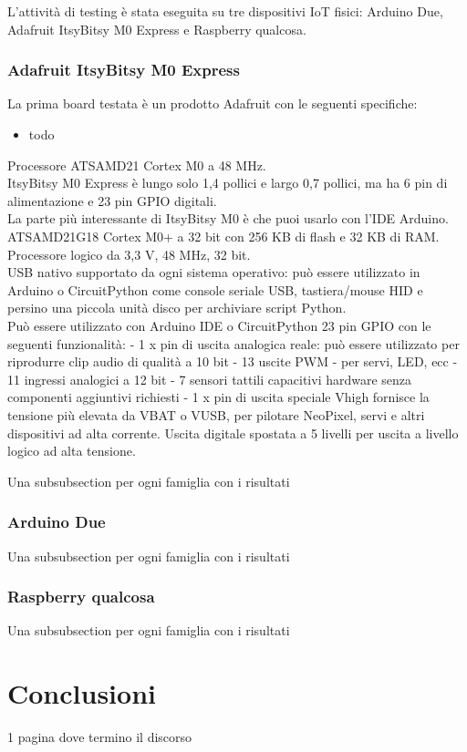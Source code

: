 \documentclass{report}
\begin{document}
L'attività di testing è stata eseguita su tre dispositivi IoT fisici: Arduino Due, Adafruit ItsyBitsy M0 Express e Raspberry qualcosa.

\subsection{Adafruit ItsyBitsy M0 Express}

La prima board testata è un prodotto Adafruit con le seguenti specifiche:
\begin{itemize}
    \item todo
\end{itemize}

Processore ATSAMD21 Cortex M0 a 48 MHz. \\
ItsyBitsy M0 Express è lungo solo 1,4 pollici e largo 0,7 pollici, ma ha 6 pin di alimentazione e 23 pin GPIO digitali. \\
La parte più interessante di ItsyBitsy M0 è che puoi usarlo con l'IDE Arduino. \\
ATSAMD21G18 Cortex M0+ a 32 bit con 256 KB di flash e 32 KB di RAM. \\
Processore logico da 3,3 V, 48 MHz, 32 bit. \\
USB nativo supportato da ogni sistema operativo: può essere utilizzato in Arduino o CircuitPython come console seriale USB, tastiera/mouse HID e persino una piccola unità disco per archiviare script Python. \\
Può essere utilizzato con Arduino IDE o CircuitPython
23 pin GPIO con le seguenti funzionalità:
- 1 x pin di uscita analogica reale: può essere utilizzato per riprodurre clip audio di qualità a 10 bit
- 13 uscite PWM - per servi, LED, ecc
- 11 ingressi analogici a 12 bit
- 7 sensori tattili capacitivi hardware senza componenti aggiuntivi richiesti
- 1 x pin di uscita speciale Vhigh fornisce la tensione più elevata da VBAT o VUSB, per pilotare NeoPixel, servi e altri dispositivi ad alta corrente. Uscita digitale spostata a 5 livelli per uscita a livello logico ad alta tensione. \cite{adafruit}

Una subsubsection per ogni famiglia con i risultati

\subsection{Arduino Due}

Una subsubsection per ogni famiglia con i risultati

\subsection{Raspberry qualcosa}

Una subsubsection per ogni famiglia con i risultati

\newpage

\chapter{Conclusioni}

1 pagina dove termino il discorso

\newpage

\printbibliography
\end{document}
